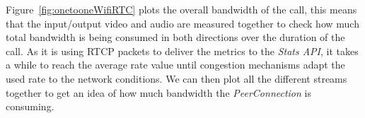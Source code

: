 Figure~\ref{fig:onetooneWifiRTC} plots the overall bandwidth of the call, this means that the input/output video and audio are measured together to check how much total bandwidth is being consumed in both directions over the duration of the call. As it is using RTCP packets to deliver the metrics to the {\it Stats API}, it takes a while to reach the average rate value until congestion mechanisms adapt the used rate to the network conditions. We can then plot all the different streams together to get an idea of how much bandwidth the {\it PeerConnection} is consuming.

%




